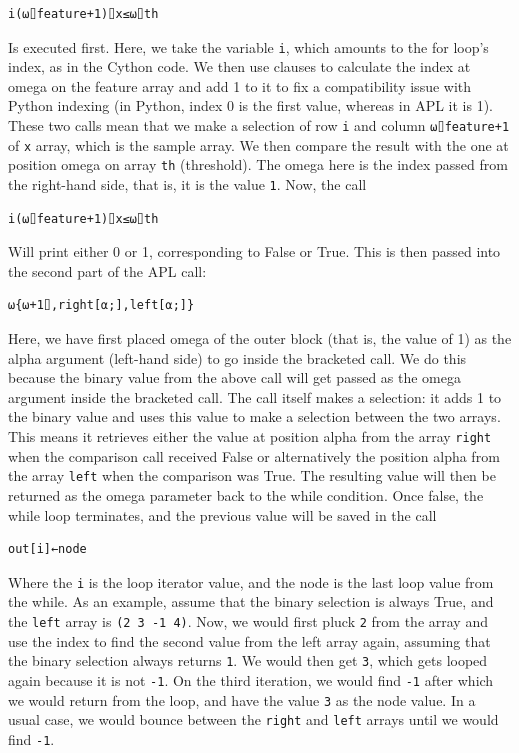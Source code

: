 \documentclass{IEEEtran}
\begin{document}
{\aplfont\begin{verbatim}
i(⍵⌷feature+1)⌷x≤⍵⌷th
\end{verbatim}}

Is executed first. Here, we take the variable \verb|i|, which amounts to the for loop's index, as in the Cython code. We then use clauses to calculate the index at omega on the feature array and add 1 to it to fix a compatibility issue with Python indexing (in Python, index 0 is the first value, whereas in APL it is 1). These two calls mean that we make a selection of row \verb|i| and column \verb|⍵⌷feature+1| of \verb|x| array, which is the sample array. We then compare the result with the one at position omega on array \verb|th| (threshold). The omega here is the index passed from the right-hand side, that is, it is the value \verb|1|. Now, the call

{\aplfont\begin{verbatim}
i(⍵⌷feature+1)⌷x≤⍵⌷th
\end{verbatim}}

Will print either 0 or 1, corresponding to False or True. This is then passed into the second part of the APL call:

{\aplfont\begin{verbatim}
⍵{⍵+1⌷,right[⍺;],left[⍺;]}
\end{verbatim}}

Here, we have first placed omega of the outer block (that is, the value of 1) as the alpha argument (left-hand side) to go inside the bracketed call. We do this because the binary value from the above call will get passed as the omega argument inside the bracketed call. The call itself makes a selection: it adds 1 to the binary value and uses this value to make a selection between the two arrays. This means it retrieves either the value at position alpha from the array \verb|right| when the comparison call received False or alternatively the position alpha from the array \verb|left| when the comparison was True. The resulting value will then be returned as the omega parameter back to the while condition. Once false, the while loop terminates, and the previous value will be saved in the call

{\aplfont\begin{verbatim}
out[i]←node
\end{verbatim}}

Where the \verb|i| is the loop iterator value, and the node is the last loop value from the while. As an example, assume that the binary selection is always True, and the \verb|left| array is \verb|(2 3 -1 4)|. Now, we would first pluck \verb|2| from the array and use the index to find the second value from the left array again, assuming that the binary selection always returns \verb|1|. We would then get \verb|3|, which gets looped again because it is not \verb|-1|. On the third iteration, we would find \verb|-1| after which we would return from the loop, and have the value \verb|3| as the node value. In a usual case, we would bounce between the \verb|right| and \verb|left| arrays until we would find \verb|-1|.
\end{document}
